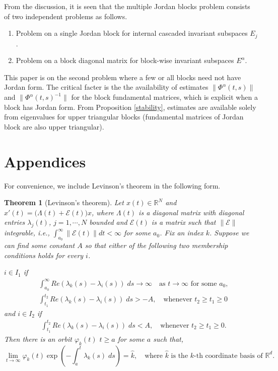 \documentclass[a4paper,11pt]{article}
\newcounter{Theorem}
\newtheorem{theorem}[Theorem]{Theorem}
\theoremstyle{remark}
\begin{document}
From the discussion, it is seen that the multiple Jordan blocks problem consists of two independent problems as follows. 
\begin{enumerate}
\item Problem on a single Jordan block for internal cascaded invariant subspaces $E_j$.
\item Problem on a block diagonal matrix for block-wise invariant subspaces $E^\alpha$.
\end{enumerate}
This paper is on the second problem where a few or all blocks need not have Jordan form. The critical facter is the the availability of estimates $\|\Phi^\alpha(t,s)\|$ and $\|\Phi^\alpha(t,s)^{-1}\|$ for the block fundamental matrices, which is explicit when a block has Jordan form. From Proposition \ref{stability}, estimates are available solely from eigenvalues for upper triangular blocks (fundamental matrices of Jordan block are also upper triangular). 

\section*{Appendices}
For convenience, we include Levinson's theorem \cite{L48} in the following form.
\begin{theorem}[Levinson's theorem] \label{thm:CL} Let $x(t)\in \mathbb{R}^N$ and $x'(t) = \big(\Lambda(t) + \mathcal{E}(t)\big)x$, where $\Lambda(t)$ is a diagonal matrix with diagonal entries $\lambda_j(t)$, $j=1,\cdots,N$ bounded and $\mathcal{E}(t)$ is a matrix such that $\|\mathcal{E}\|$ integrable, i.e., $\int_{a_0}^\infty \|\mathcal{E}(t)\| dt < \infty$ for some $a_0$.
Fix an index $k$. Suppose we can find some constant $A$ so that either of the following two membership conditions holds for every $i$.

$i \in I_1$ if
\begin{align}
&\int_{a_0}^\infty Re(\lambda_k(s) -\lambda_i(s))\; ds \rightarrow \infty \quad \text{as $t \rightarrow \infty$ for some $a_0$},\label{eq:I1cond1}\\
&\int_{t_1}^{t_2} Re(\lambda_k(s) -\lambda_i(s))\; ds > -A, \quad \text{whenever $t_2\ge t_1\ge 0$} \label{eq:I1cond2}
\end{align}
and $i \in I_2$ if
\begin{align}
&\int_{t_1}^{t_2} Re(\lambda_k(s) -\lambda_i(s))\; ds < A, \quad \text{whenever $t_2\ge t_1\ge 0$}. \label{eq:I2cond}
\end{align}
Then there is an orbit $\varphi_k(t)$ $t\ge a$ for some $a$ such that,
\begin{equation}
\lim_{t \rightarrow \infty} \varphi_k(t) \exp\left(-\int_{a}^t \lambda_k(s)\; ds\right) = \hat{k}, \quad \text{where $\hat{k}$ is the $k$-th coordinate basis of $\mathbb{R}^d$.}
\end{equation}
\end{theorem}
\end{document}

